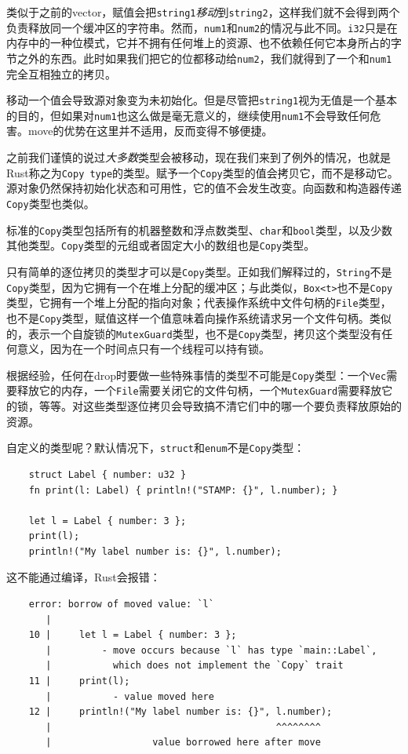 类似于之前的vector，赋值会把\texttt{string1}\emph{移动}到\texttt{string2}，这样我们就不会得到两个负责释放同一个缓冲区的字符串。然而，\texttt{num1}和\texttt{num2}的情况与此不同。\texttt{i32}只是在内存中的一种位模式，它并不拥有任何堆上的资源、也不依赖任何它本身所占的字节之外的东西。此时如果我们把它的位都移动给\texttt{num2}，我们就得到了一个和\texttt{num1}完全互相独立的拷贝。

移动一个值会导致源对象变为未初始化。但是尽管把\texttt{string1}视为无值是一个基本的目的，但如果对\texttt{num1}也这么做是毫无意义的，继续使用\texttt{num1}不会导致任何危害。move的优势在这里并不适用，反而变得不够便捷。

之前我们谨慎的说过\emph{大多数}类型会被移动，现在我们来到了例外的情况，也就是Rust称之为\texttt{Copy type}的类型。赋予一个\texttt{Copy}类型的值会拷贝它，而不是移动它。源对象仍然保持初始化状态和可用性，它的值不会发生改变。向函数和构造器传递\texttt{Copy}类型也类似。

标准的\texttt{Copy}类型包括所有的机器整数和浮点数类型、\texttt{char}和\texttt{bool}类型，以及少数其他类型。\texttt{Copy}类型的元组或者固定大小的数组也是\texttt{Copy}类型。

只有简单的逐位拷贝的类型才可以是\texttt{Copy}类型。正如我们解释过的，\texttt{String}不是\texttt{Copy}类型，因为它拥有一个在堆上分配的缓冲区；与此类似，\texttt{Box<t>}也不是\texttt{Copy}类型，它拥有一个堆上分配的指向对象；代表操作系统中文件句柄的\texttt{File}类型，也不是\texttt{Copy}类型，赋值这样一个值意味着向操作系统请求另一个文件句柄。类似的，表示一个自旋锁的\texttt{MutexGuard}类型，也不是\texttt{Copy}类型，拷贝这个类型没有任何意义，因为在一个时间点只有一个线程可以持有锁。

根据经验，任何在drop时要做一些特殊事情的类型不可能是\texttt{Copy}类型：一个\texttt{Vec}需要释放它的内存，一个\texttt{File}需要关闭它的文件句柄，一个\texttt{MutexGuard}需要释放它的锁，等等。对这些类型逐位拷贝会导致搞不清它们中的哪一个要负责释放原始的资源。

自定义的类型呢？默认情况下，\texttt{struct}和\texttt{enum}不是\texttt{Copy}类型：
\begin{verbatim}
    struct Label { number: u32 }
    fn print(l: Label) { println!("STAMP: {}", l.number); }

    let l = Label { number: 3 };
    print(l);
    println!("My label number is: {}", l.number);
\end{verbatim}

这不能通过编译，Rust会报错：
\begin{verbatim}
    error: borrow of moved value: `l`
       |
    10 |     let l = Label { number: 3 };
       |         - move occurs because `l` has type `main::Label`,
       |           which does not implement the `Copy` trait
    11 |     print(l);
       |           - value moved here
    12 |     println!("My label number is: {}", l.number);
       |                                        ^^^^^^^^
       |                  value borrowed here after move
\end{verbatim}

